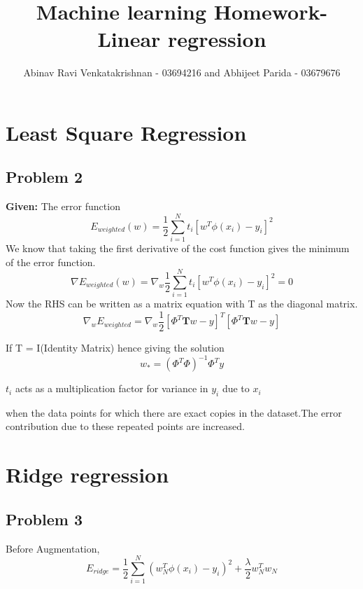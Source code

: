 \documentclass[5pt,a4paper]{article}
\begin{document}
	\title{Machine learning Homework- Linear regression}
	\author{Abinav Ravi Venkatakrishnan - 03694216 and Abhijeet Parida - 03679676}
	\maketitle
	
	\section{Least Square Regression}
	\subsection*{Problem 2}
	\textbf{Given:} The error function 
	\begin{equation}
	E_{weighted}(w) = \frac{1}{2}\sum_{i=1}^{N}t_i[w^T \phi(x_i)-y_i]^2
	\end{equation}
	We know that taking the first derivative of the cost function gives the minimum of the error function.
	\begin{equation}
	\nabla E_{weighted}(w) = \nabla_w \frac{1}{2}\sum_{i=1}^{N}t_i[w^T \phi(x_i)-y_i]^2 = 0
	\end{equation}
	Now the RHS can be written as a matrix equation with T as the diagonal matrix. 
	\begin{equation}
	\nabla_w E_{weighted} = \nabla_w \frac{1}{2}  [\Phi^T\textbf{T}w - y]^T[\Phi^T\textbf{T}w - y]
	\end{equation} 
	
	If T = I(Identity Matrix) hence giving the solution
	\begin{equation}
	w_* = (\Phi^T\Phi )^{-1} \Phi^T y 
	\end{equation}
	
	$t_i$ acts as a multiplication factor for variance in $y_i$ due to $x_i$
	
	when the data points for which there are exact copies in the dataset.The error contribution due to these repeated points are increased. 
	
	\section{Ridge regression}
	\subsection*{Problem 3}
	Before Augmentation,
	\begin{equation}
	E_{ridge}=\frac{1}{2}\sum_{i=1}^{N}(w^T_N \phi(x_i)-y_i)^2+\frac{\lambda}{2} w_N^Tw_N \label{eqn2}
	\end{equation}
	
\end{document}
